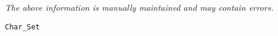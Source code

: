 \label{pkg:char\_set}

{\tiny \it The above information is manually maintained and may contain errors.}
\begin{verbatim}
Char_Set
\end{verbatim}

